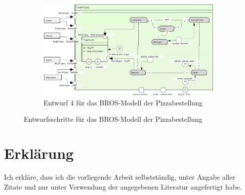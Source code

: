 \begin{figure}
\begin{subfigure}{0.8\textwidth}
        \label{fig:pizzaBros4}
    \end{subfigure}
    \begin{subfigure}{0.8\textwidth}
        \centering
        \includegraphics[width=\textwidth,keepaspectratio]{../images/example/bros-rule5.png}%
        \caption{Entwurf 4 für das BROS-Modell der Pizzabestellung}%
        \label{fig:pizzaBros5}
    \end{subfigure}
    \caption{Entwurfsschritte für das BROS-Modell der Pizzabestellung}%
    \label{fig:pizzaBrosSteps}
\end{figure}

\begin{figure}
    
\end{figure}

\chapter*{Erklärung}

Ich erkläre, dass ich die vorliegende Arbeit selbstständig, unter Angabe aller Zitate und nur unter Verwendung der angegebenen Literatur angefertigt habe.


\begin{figure}[H]
    \centering
\end{figure}
